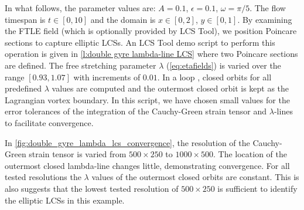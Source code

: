 \documentclass{elsarticle}
\begin{document}
In what follows, the parameter values are: $A = 0.1$, $\epsilon = 0.1$, $\omega = \pi/5$. The flow timespan is $t \in [0,10]$ and the domain is $x \in [0,2]$, $y \in [0,1]$. By examining the FTLE field (which
is optionally provided by LCS Tool), we position Poincare sections to capture elliptic LCSs. An LCS Tool demo script to perform this operation is given in \cref{l:double gyre lambda-line LCS} where two Poincare sections are defined. The free stretching parameter $\lambda$ (\cref{eq:etafields}) is varied over the range $[0.93,1.07]$ with increments of $0.01$. In a loop , closed orbits for all predefined $\lambda$ values are computed and the outermost closed orbit is kept as the Lagrangian vortex boundary. In this script, we have chosen small values for the error tolerances of the integration of the Cauchy-Green strain tensor and $\lambda$-lines to facilitate convergence.



In \cref{fig:double_gyre_lambda_lcs_convergence}, the resolution of the  Cauchy-Green strain tensor is varied from $500 \times 250$ to $1000 \times 500$. The location of the outermost closed lambda-line changes little, demonstrating convergence. For all tested resolutions the $\lambda$ values of the outermost closed orbits are constant. This is also suggests that the lowest tested resolution of $500 \times 250$ is sufficient to identify the elliptic LCSs in this example.
\end{document}
